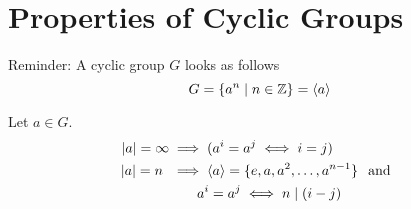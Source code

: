 \section{Properties of Cyclic Groups}


Reminder: A cyclic group $G$ looks as follows
\begin{equation}
  G = \{ a^n \mid n \in \mathbb{Z} \} = \langle a \rangle
\end{equation}

\begin{thm}[Criterion for $a^i = a^j$]
  \label{thm: Criterion for a^i = a^j}
  Let $a \in G$.
  \begin{equation}
    \begin{aligned}
       \abs{a} = \infty & \implies (a^i = a^j \iff i = j ) \\
       \abs{a} = n \;\, & \implies \langle a \rangle = \{e,a,a^2,\ldots, a^{n-1} \} \;\;\, \text{and}\;\; \\
        \quad & \qquad a^i = a^j \iff n \mid (i-j)
    \end{aligned}
  \end{equation}
\end{thm}
